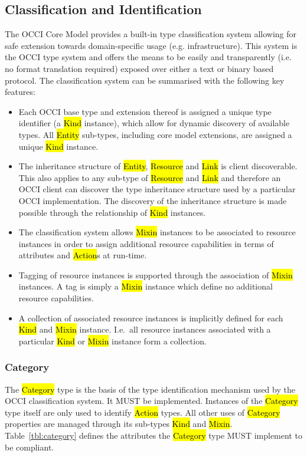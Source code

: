 \documentclass[10pt,a4paper]{article}
\begin{document}
\subsection{Classification and Identification}
\label{sec:classification}
The OCCI Core Model provides a built-in type classification system allowing for safe
extension towards domain-specific usage (e.g. infrastructure). This system is the OCCI type system
and offers the means to be easily and transparently (i.e. no format translation required) exposed over either a text or binary based protocol.
%
The classification system can be summarised with the following key features:
\begin{itemize}
\item Each OCCI base type and extension thereof is assigned a unique type
 identifier (a \hl{Kind} instance), which allow for dynamic discovery of
 available types. All \hl{Entity} sub-types, including core model extensions, are assigned
 a unique \hl{Kind} instance.
\item The inheritance structure of \hl{Entity}, \hl{Resource} and \hl{Link} is
 client discoverable. This also applies to any sub-type of \hl{Resource} and
 \hl{Link} and therefore an OCCI client can discover the type inheritance structure
 used by a particular OCCI implementation. The discovery of the inheritance
 structure is made possible through the relationship of \hl{Kind} instances.
\item The classification system allows \hl{Mixin} instances to be associated
 to resource instances in order to assign additional resource capabilities in terms of
 attributes and \hl{Action}s at run-time.
\item Tagging of resource instances is supported through the association
 of \hl{Mixin} instances. A tag is simply a \hl{Mixin} instance which define no
 additional resource capabilities.
\item A collection of associated resource instances is implicitly defined for
 each \hl{Kind} and \hl{Mixin} instance. I.e.~all resource instances associated
 with a particular \hl{Kind} or \hl{Mixin} instance form a collection.
\end{itemize}

\subsubsection{Category}
\label{sec:category}
The \hl{Category} type is the basis of the type
identification mechanism used by the
OCCI classification system. It MUST be implemented. Instances of the
\hl{Category} type itself are only used to identify \hl{Action} types. All
other uses of \hl{Category} properties are managed through its sub-types
\hl{Kind} and \hl{Mixin}.
%
Table~\ref{tbl:category} defines the attributes the \hl{Category} type MUST
implement to be compliant.
\end{document}

